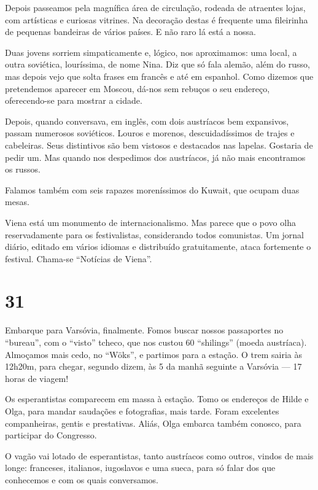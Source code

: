 Depois passeamos pela magnífica área de circulação, rodeada de atraentes lojas, com artísticas e curiosas vitrines. Na decoração destas é frequente uma fileirinha de pequenas bandeiras de vários países. E não raro lá está a nossa.

Duas jovens sorriem simpaticamente e, lógico, nos aproximamos: uma local, a outra soviética, louríssima, de nome Nina. Diz que só fala alemão, além do russo, mas depois vejo que solta frases em francês e até em espanhol. Como dizemos que pretendemos aparecer em Moscou, dá-nos sem rebuços o seu endereço, oferecendo-se para mostrar a cidade.

Depois, quando conversava, em inglês, com dois austríacos bem expansivos, passam numerosos soviéticos. Louros e morenos, descuidadíssimos de trajes e cabeleiras. Seus distintivos são bem vistosos e destacados nas lapelas. Gostaria de pedir um. Mas quando nos despedimos dos austríacos, já não mais encontramos os russos.

Falamos também com seis rapazes moreníssimos do Kuwait, que ocupam duas mesas.

Viena está um monumento de internacionalismo. Mas parece que o povo olha reservadamente para os festivalistas, considerando todos comunistas. Um jornal diário, editado em vários idiomas e distribuído gratuitamente, ataca fortemente o festival. Chama-se ``Notícias de Viena''.

\section*{31 \adfflatleafright {}}
Embarque para Varsóvia, finalmente. Fomos buscar nossos passaportes no ``bureau'', com o ``visto'' tcheco, que nos custou 60 ``shilings'' (moeda austríaca). Almoçamos mais cedo, no ``Wöks'', e partimos para a estação. O trem sairia às 12h20m, para chegar, segundo dizem, às 5 da manhã seguinte a Varsóvia --- 17 horas de viagem!

Os esperantistas comparecem em massa à estação. Tomo os endereços de Hilde e Olga, para mandar saudações e fotografias, mais tarde. Foram excelentes companheiras, gentis e prestativas. Aliás, Olga embarca também conosco, para participar do Congresso.

O vagão vai lotado de esperantistas, tanto austríacos como outros, vindos de mais longe: franceses, italianos, iugoslavos e uma sueca, para só falar dos que conhecemos e com os quais conversamos.


